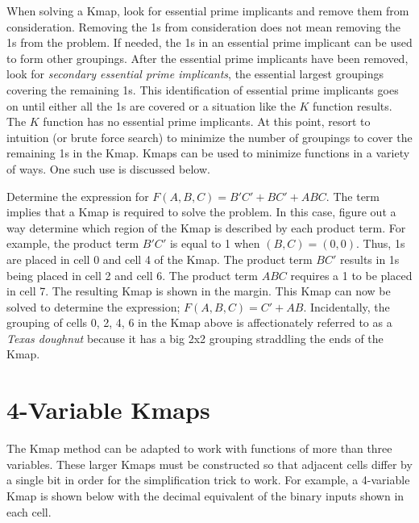 When solving a Kmap, look for essential prime implicants and
remove them from consideration.  Removing the 1s from consideration does not
mean removing the 1s from the problem.  If needed, the 1s in an essential
prime implicant can be used to form other groupings.
After the essential prime implicants
have been removed, look for \textit{secondary essential prime implicants},
the essential largest groupings covering the remaining 1s.
This identification of essential
prime implicants goes on until either all the 1s are covered or
a situation like the $K$ function results.  The $K$ function has no
essential prime implicants.  At this point, resort to intuition
(or brute force search) to minimize the number of groupings
to cover the remaining 1s in the Kmap.  Kmaps can be used to
minimize functions in a variety of ways.  One such use is discussed below.

\begin{changemargin}{1.5cm}{1.5cm}
Determine the \SOPmin expression for $F(A,B,C) = B'C' + BC' + ABC$.  The
\label{page:SymbToSymb} term \SOPmin implies that a Kmap is
required to solve the problem. In this case, figure out a way
determine which region of the Kmap is described by each product term.
For example, the product term $B'C'$ is equal to 1 when $(B,C) = (0,0)$.
Thus, 1s are placed in cell 0 and cell 4 of the Kmap. The product term $BC'$
results in 1s being placed in cell 2 and cell 6.  The product term $ABC$
requires a 1 to be placed in cell 7.  The resulting Kmap is shown in the
margin.
This Kmap can now be solved to determine the \SOPmin expression;
$F(A,B,C) = C'+AB$.  Incidentally, the grouping of cells 0, 2, 4, 6
in the Kmap above is affectionately referred to as a
 \textit{Texas doughnut} because it has a big 2x2
grouping straddling the ends of the Kmap.
\end{changemargin}

\section{4-Variable Kmaps}
The Kmap method can be adapted to work with functions of more than three
variables.  These larger Kmaps must be constructed so that adjacent
cells differ by a single bit in order for the simplification trick
to work.  For example, a 4-variable Kmap is shown below with the
decimal equivalent of the binary inputs shown in each cell.

